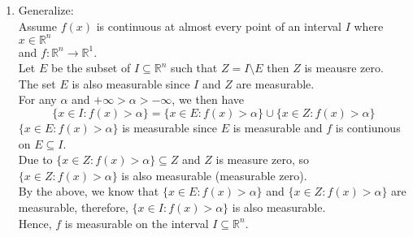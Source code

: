 \documentclass[a4paper,11pt]{article}
\begin{document}
\begin{enumerate}
\begin{enumerate}
\item Generalize:\\

Assume $f(x)$ is continuous at almost every point of an interval $I$ where $x \in \mathbb{R}^n$ \\and $f: \mathbb{R}^n \to \mathbb{R}^1$.\\
Let $E$ be the subset of $I \subseteq \mathbb{R}^n$ such that $Z = I \setminus E$ then $Z$ is meausre zero.\\
The set $E$ is also measurable since $I$ and $Z$ are measurable.\\
For any $\alpha$ and $+\infty > \alpha > -\infty$, we then have
$$\{ x \in I : f(x) > \alpha\} = \{ x \in E : f(x) > \alpha\} \cup \{ x \in Z : f(x) > \alpha\}$$
$\{ x \in E : f(x) > \alpha\}$ is measurable since $E$ is measurable and $f$ is contiunous on $E \subseteq I$.\\
Due to $\{ x \in Z : f(x) > \alpha\} \subseteq Z$ and $Z$ is measure zero, so $\{ x \in Z : f(x) > \alpha\}$ is also measurable (measurable zero).\\
By the above, we know that $\{ x \in E : f(x) > \alpha\}$ and $\{ x \in Z : f(x) > \alpha\}$ are measurable, therefore, $\{ x \in I : f(x) > \alpha\}$ is also measurable.\\
Hence, $f$ is measurable on the interval $I \subseteq \mathbb{R}^n$.\\


\end{enumerate}




\end{enumerate}
\end{document}
